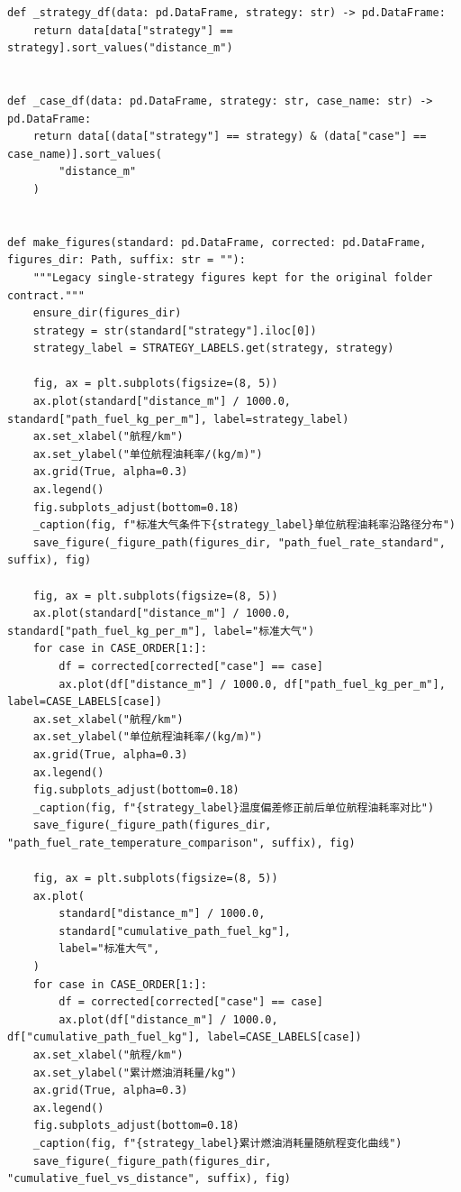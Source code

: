 \documentclass[UTF8]{ctexart}
\begin{document}
\begin{center}
\begin{lstlisting}
def _strategy_df(data: pd.DataFrame, strategy: str) -> pd.DataFrame:
    return data[data["strategy"] == strategy].sort_values("distance_m")


def _case_df(data: pd.DataFrame, strategy: str, case_name: str) -> pd.DataFrame:
    return data[(data["strategy"] == strategy) & (data["case"] == case_name)].sort_values(
        "distance_m"
    )


def make_figures(standard: pd.DataFrame, corrected: pd.DataFrame, figures_dir: Path, suffix: str = ""):
    """Legacy single-strategy figures kept for the original folder contract."""
    ensure_dir(figures_dir)
    strategy = str(standard["strategy"].iloc[0])
    strategy_label = STRATEGY_LABELS.get(strategy, strategy)

    fig, ax = plt.subplots(figsize=(8, 5))
    ax.plot(standard["distance_m"] / 1000.0, standard["path_fuel_kg_per_m"], label=strategy_label)
    ax.set_xlabel("航程/km")
    ax.set_ylabel("单位航程油耗率/(kg/m)")
    ax.grid(True, alpha=0.3)
    ax.legend()
    fig.subplots_adjust(bottom=0.18)
    _caption(fig, f"标准大气条件下{strategy_label}单位航程油耗率沿路径分布")
    save_figure(_figure_path(figures_dir, "path_fuel_rate_standard", suffix), fig)

    fig, ax = plt.subplots(figsize=(8, 5))
    ax.plot(standard["distance_m"] / 1000.0, standard["path_fuel_kg_per_m"], label="标准大气")
    for case in CASE_ORDER[1:]:
        df = corrected[corrected["case"] == case]
        ax.plot(df["distance_m"] / 1000.0, df["path_fuel_kg_per_m"], label=CASE_LABELS[case])
    ax.set_xlabel("航程/km")
    ax.set_ylabel("单位航程油耗率/(kg/m)")
    ax.grid(True, alpha=0.3)
    ax.legend()
    fig.subplots_adjust(bottom=0.18)
    _caption(fig, f"{strategy_label}温度偏差修正前后单位航程油耗率对比")
    save_figure(_figure_path(figures_dir, "path_fuel_rate_temperature_comparison", suffix), fig)

    fig, ax = plt.subplots(figsize=(8, 5))
    ax.plot(
        standard["distance_m"] / 1000.0,
        standard["cumulative_path_fuel_kg"],
        label="标准大气",
    )
    for case in CASE_ORDER[1:]:
        df = corrected[corrected["case"] == case]
        ax.plot(df["distance_m"] / 1000.0, df["cumulative_path_fuel_kg"], label=CASE_LABELS[case])
    ax.set_xlabel("航程/km")
    ax.set_ylabel("累计燃油消耗量/kg")
    ax.grid(True, alpha=0.3)
    ax.legend()
    fig.subplots_adjust(bottom=0.18)
    _caption(fig, f"{strategy_label}累计燃油消耗量随航程变化曲线")
    save_figure(_figure_path(figures_dir, "cumulative_fuel_vs_distance", suffix), fig)



\end{lstlisting}
\end{center}
\end{document}
